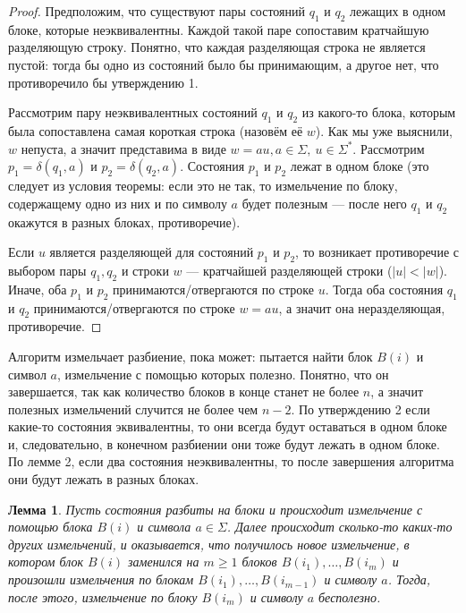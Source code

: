 \documentclass{article}
\newtheorem{lemma}{Лемма}
\begin{document}
\begin{proof}
Предположим, что существуют пары состояний $q_1$ и $q_2$ лежащих в одном блоке, которые неэквивалентны. Каждой такой паре сопоставим кратчайшую разделяющую строку. Понятно, что каждая разделяющая строка не является пустой: тогда бы одно из состояний было бы принимающим, а другое нет, что противоречило бы утверждению 1.

Рассмотрим пару неэквивалентных состояний $q_1$ и $q_2$ из какого-то блока, которым была сопоставлена самая короткая строка (назовём её $w$). Как мы уже выяснили, $w$ непуста, а значит представима в виде $w = au, a \in \Sigma, \ u \in \Sigma^*$. Рассмотрим $p_1 = \delta(q_1, a)$ и $p_2 = \delta(q_2, a)$. Состояния $p_1$ и $p_2$ лежат в одном блоке (это следует из условия теоремы: если это не так, то измельчение по блоку, содержащему одно из них и по символу $a$ будет полезным --- после него $q_1$ и $q_2$ окажутся в разных блоках, противоречие).

Если $u$ является разделяющей для состояний $p_1$ и $p_2$, то возникает противоречие с выбором пары $q_1, q_2$ и строки $w$ --- кратчайшей разделяющей строки ($|u| < |w|$). Иначе, оба $p_1$ и $p_2$ принимаются/отвергаются по строке $u$. Тогда оба состояния $q_1$ и $q_2$ принимаются/отвергаются по строке $w=au$, а значит она неразделяющая, противоречие.
\end{proof}
Алгоритм измельчает разбиение, пока может: пытается найти блок $B(i)$ и символ $a$, измельчение с помощью которых полезно. Понятно, что он завершается, так как количество блоков в конце станет не более $n$, а значит полезных измельчений случится не более чем $n - 2$. По утверждению 2 если какие-то состояния эквивалентны, то они всегда будут оставаться в одном блоке и, следовательно, в конечном разбиении они тоже будут лежать в одном блоке. По лемме 2, если два состояния неэквивалентны, то после завершения алгоритма они будут лежать в разных блоках. 
\begin{lemma}
    Пусть состояния разбиты на блоки и происходит измельчение с помощью блока $B(i)$ и символа $a \in \Sigma$. Далее происходит сколько-то каких-то других измельчений, и оказывается, что получилось новое измельчение, в котором блок $B(i)$ заменился на $m \ge 1$ блоков $B(i_1), \dots, B(i_m)$ и произошли измельчения по блокам $B(i_1), \dots , B(i_{m - 1})$ и символу $a$. Тогда, после этого, измельчение по блоку $B(i_m)$ и символу $a$ бесполезно.
\end{lemma}
\end{document}
